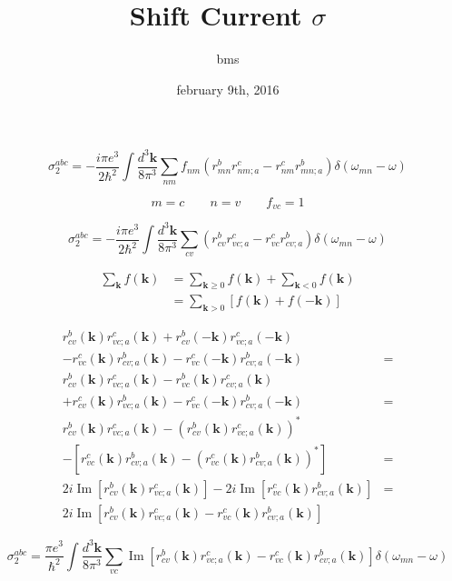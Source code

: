 \documentclass{article}
\title{Shift Current $\sigma$}
\author{bms}
\date{february 9th, 2016}
\begin{document}
\maketitle

\begin{equation*}
\sigma^{abc}_2 = - \frac{i \pi e^{3}}{2 \hbar^{2}} \int \frac{d^{3}\mathbf{k}}{8\pi^{3}}
\sum_{nm}f_{nm}(r^{b}_{mn} r^{c}_{nm;a} - r^{c}_{nm} r^{b}_{mn;a})
\delta(\omega_{mn} - \omega)
\end{equation*}

\begin{equation*}
m = c \qquad
n = v \qquad
f_{vc} = 1
\end{equation*}

\begin{equation*}
\sigma^{abc}_2 = - \frac{i \pi e^{3}}{2 \hbar^{2}} \int \frac{d^{3}\mathbf{k}}{8\pi^{3}}
\sum_{cv}(r^{b}_{cv} r^{c}_{vc;a} - r^{c}_{vc} r^{b}_{cv;a})
\delta(\omega_{mn} - \omega)
\end{equation*}

\begin{align*}
\sum_{\mathbf{k}}f(\mathbf{k}) &= \sum_{\mathbf{k}\geq 0}f(\mathbf{k}) + 
\sum_{\mathbf{k}<0}f(\mathbf{k}) \\
&= \sum_{\mathbf{k}>0} \left[f(\mathbf{k}) + f(\mathbf{-k}) \right]
\end{align*}

\begin{align*}      
  r^{b}_{cv}(\mathbf{k}) r^{c}_{vc;a}(\mathbf{k}) + 
  r^{b}_{cv}(-\mathbf{k})r^{c}_{vc;a}(-\mathbf{k}) & \\
- r^{c}_{vc}(\mathbf{k}) r^{b}_{cv;a}(\mathbf{k}) - 
  r^{c}_{vc}(-\mathbf{k})r^{b}_{cv;a}(-\mathbf{k}) & = \\
  r^{b}_{cv}(\mathbf{k}) r^{c}_{vc;a}(\mathbf{k}) - 
  r^{b}_{vc}(\mathbf{k}) r^{c}_{cv;a}(\mathbf{k}) & \\
+ r^{c}_{cv}(\mathbf{k}) r^{b}_{vc;a}(\mathbf{k}) - 
  r^{c}_{vc}(-\mathbf{k})r^{b}_{cv;a}(-\mathbf{k}) & = \\
  r^{b}_{cv}(\mathbf{k}) r^{c}_{vc;a}(\mathbf{k}) -
  (r^{b}_{cv}(\mathbf{k}) r^{c}_{vc;a}(\mathbf{k}))^{*} \\
- [r^{c}_{vc}(\mathbf{k})r^{b}_{cv;a}(\mathbf{k})
- (r^{c}_{vc}(\mathbf{k})r^{b}_{cv;a}(\mathbf{k}))^{*}] & = \\
  2i \operatorname{Im} [r^{b}_{cv}(\mathbf{k}) r^{c}_{vc;a}(\mathbf{k})] - 
  2i \operatorname{Im} [r^{c}_{vc}(\mathbf{k}) r^{b}_{cv;a}(\mathbf{k})] & = \\
  2i \operatorname{Im} [r^{b}_{cv}(\mathbf{k}) r^{c}_{vc;a}(\mathbf{k}) - 
  r^{c}_{vc}(\mathbf{k}) r^{b}_{cv;a}(\mathbf{k})]
\end{align*}        

\begin{equation*}
\sigma^{abc}_2 = \frac{\pi e^{3}}{\hbar^{2}} \int \frac{d^{3}\mathbf{k}}{8\pi^{3}}
\sum_{vc}\operatorname{Im}[r^{b}_{cv}(\mathbf{k}) r^{c}_{vc;a}(\mathbf{k}) - 
r^{c}_{vc}(\mathbf{k}) r^{b}_{cv;a}(\mathbf{k})]
\delta(\omega_{mn} - \omega)
\end{equation*}
\end{document}
